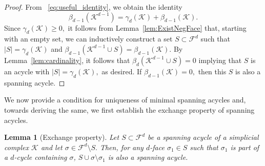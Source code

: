 \documentclass[12pt]{amsart}
\newcommand{\dy}[1]{\textcolor{magenta}{#1}}
\newcommand{\gt}[1]{\textcolor{blue}{#1}}
\renewcommand{\dy}[1]{#1}
\renewcommand{\gt}[1]{#1}
\newtheorem{lemma}[theorem]{Lemma}
\numberwithin{equation}{section}
\numberwithin{theorem}{section}
\newcommand{\1}{\mathbf{1}}
\def\F{\mathcal{F}}
\def\K{\mathcal{K}}
\begin{document}
\begin{proof}
From ~\eqref{eq:useful_identity}, we obtain the identity
$$\beta_{d - 1}(\K^{d - 1}) = \gamma_{d}(\K) + \beta_{d-1}(\K).$$
  Since $\gamma_{d}(\K) \geq 0,$ it follows from Lemma~\ref{lem:ExistNegFace} that, starting with an empty set, we can inductively construct a set $S \subset \F^d$ such that $|S| = \gamma_d(\K)$ and $\beta_{d - 1}(\K^{d - 1} \cup S) = \beta_{d - 1}(\K).$  By Lemma~\ref{lem:cardinality}, it follows that $\beta_d(\K^{d- 1} \cup S) = 0$ implying that $S$ is an acycle with $|S| = \gamma_d(\K),$ as desired. If $\beta_{d - 1}(\K) = 0,$ then this $S$ is also a spanning acycle.
\end{proof}
%
%
\dy{We now provide a condition for uniqueness \gt{of} minimal spanning acycles and, towards \gt{deriving} the same, we first establish the exchange property \gt{of} spanning acycles.}
%
\begin{lemma}[Exchange property]
\label{lem:exchange}
Let $S \subset \F^d$ be a spanning acycle of a simplicial complex $\K$ and let $\sigma \in \F^d \setminus S.$ Then, for any $d$-face $\sigma_1 \in S$ such that $\sigma_1$ is part of a $d$-cycle containing $\sigma$, $S \cup \sigma \setminus
\sigma_1$ is also a spanning acycle.
\end{lemma}
\end{document}
